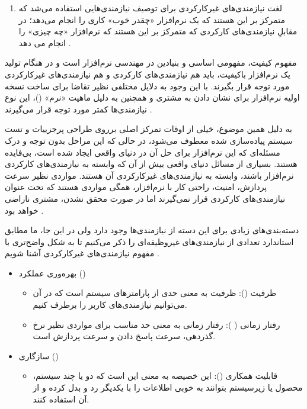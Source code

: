 {\begin{enumerate}[a)]
\begin{enumerate}[1-]
	\item 
	لغت نیازمندی‌های غیرکارکردی برای توصیف نیازمندی‌هایی استفاده می‌شد که متمرکز بر این هستند که یک نرم‌افزار «چقدر خوب» کاری را انجام می‌دهد؛ در مقابلِ نیازمندی‌های کارکردی که متمرکز بر این هستند که نرم‌افزار «چه چیزی» را انجام می دهد \cite{refqs}.

	
\end{enumerate}

مفهوم کیفیت، مفهومی اساسی و بنیادین در مهندسی نرم‌افزار است و در هنگام تولید یک نرم‌افزار باکیفیت، باید هم نیازمندی‌های کارکردی و هم نیازمندی‌های غیرکارکردی مورد توجه قرار بگیرند. با این وجود به دلایل مختلفی نظیر تقاضا برای ساخت نسخه اولیه نرم‌افزار برای نشان دادن به مشتری و همچنین به دلیل ماهیت «نرم» ()، این نوع نیازمندی‌ها کمتر مورد توجه قرار می‌گیرند \cite{chung}.
	
	به دلیل همین موضوع، خیلی از اوقات تمرکز اصلی برروی طراحی پرجزییات و تست سیستم پیاده‌سازی شده معطوف می‌شود، در حالی که این مراحل بدون توجه و درک مسئله‌ای که این نرم‌افزار برای حل آن در دنیای واقعی ایجاد شده است، بی‌فایده هستند. بسیاری از مسائل دنیای واقعی بیش‌ از آن‌ که وابسته به نیازمندی‌های کارکردی نرم‌افزار باشند، وابسته به نیازمندی‌های غیرکارکردی آن هستند. مواردی نظیر سرعت پردازش، امنیت، راحتی کار با نرم‌افزار، همگی مواردی هستند که تحت عنوان نیازمندی‌های کارکردی قرار نمی‌گیرند اما در صورت محقق نشدن، مشتری ناراضی خواهد بود \cite{chung}.
	
	دسته‌بندی‌های زیادی برای این دسته از نیازمندی‌ها وجود دارد ولی در این جا، ما مطابق استاندارد  تعدادی از نیازمندی‌های غیروظیفه‌ای را ذکر می‌کنیم تا به شکل واضح‌تری با مفهوم نیازمندی‌های غیرکارکردی آشنا شویم \cite{iso25010}.
	
	\begin{itemize}
		\item 
		بهره‌وری عملکرد ()
		
		\begin{itemize}
			\item
			ظرفیت (): ظرفیت به معنی حدی از پارامترهای سیستم است که در آن می‌توانیم نیازمندی‌های کاربر را برطرف کنیم.
			
			\item 
			رفتار زمانی ( ): رفتار زمانی به معنی حد مناسب برای مواردی نظیر نرخ گذردهی، سرعت پاسخ دادن و سرعت پردازش است.
			
		\end{itemize}
		
		\item
		سازگاری ()
		\begin{itemize}
			\item
			قابلیت همکاری (): این خصیصه به معنی این است که دو یا چند سیستم، محصول یا زیر‌سیستم بتوانند به خوبی اطلاعات را با یکدیگر رد و بدل کرده و از آن استفاده کنند.
			

\end{itemize}
\end{itemize}
\end{enumerate}}
